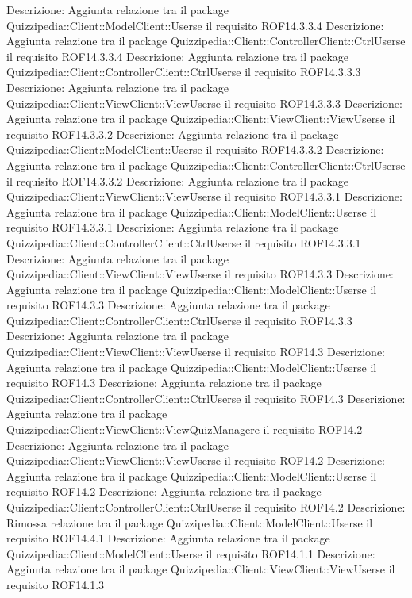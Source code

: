 Descrizione: Aggiunta relazione tra il package Quizzipedia::Client::ModelClient::Userse il requisito ROF14.3.3.4 
Descrizione: Aggiunta relazione tra il package Quizzipedia::Client::ControllerClient::CtrlUserse il requisito ROF14.3.3.4 
Descrizione: Aggiunta relazione tra il package Quizzipedia::Client::ControllerClient::CtrlUserse il requisito ROF14.3.3.3 
Descrizione: Aggiunta relazione tra il package Quizzipedia::Client::ViewClient::ViewUserse il requisito ROF14.3.3.3 
Descrizione: Aggiunta relazione tra il package Quizzipedia::Client::ViewClient::ViewUserse il requisito ROF14.3.3.2 
Descrizione: Aggiunta relazione tra il package Quizzipedia::Client::ModelClient::Userse il requisito ROF14.3.3.2 
Descrizione: Aggiunta relazione tra il package Quizzipedia::Client::ControllerClient::CtrlUserse il requisito ROF14.3.3.2 
Descrizione: Aggiunta relazione tra il package Quizzipedia::Client::ViewClient::ViewUserse il requisito ROF14.3.3.1 
Descrizione: Aggiunta relazione tra il package Quizzipedia::Client::ModelClient::Userse il requisito ROF14.3.3.1 
Descrizione: Aggiunta relazione tra il package Quizzipedia::Client::ControllerClient::CtrlUserse il requisito ROF14.3.3.1 
Descrizione: Aggiunta relazione tra il package Quizzipedia::Client::ViewClient::ViewUserse il requisito ROF14.3.3 
Descrizione: Aggiunta relazione tra il package Quizzipedia::Client::ModelClient::Userse il requisito ROF14.3.3 
Descrizione: Aggiunta relazione tra il package Quizzipedia::Client::ControllerClient::CtrlUserse il requisito ROF14.3.3 
Descrizione: Aggiunta relazione tra il package Quizzipedia::Client::ViewClient::ViewUserse il requisito ROF14.3 
Descrizione: Aggiunta relazione tra il package Quizzipedia::Client::ModelClient::Userse il requisito ROF14.3 
Descrizione: Aggiunta relazione tra il package Quizzipedia::Client::ControllerClient::CtrlUserse il requisito ROF14.3 
Descrizione: Aggiunta relazione tra il package Quizzipedia::Client::ViewClient::ViewQuizManagere il requisito ROF14.2 
Descrizione: Aggiunta relazione tra il package Quizzipedia::Client::ViewClient::ViewUserse il requisito ROF14.2 
Descrizione: Aggiunta relazione tra il package Quizzipedia::Client::ModelClient::Userse il requisito ROF14.2 
Descrizione: Aggiunta relazione tra il package Quizzipedia::Client::ControllerClient::CtrlUserse il requisito ROF14.2 
Descrizione: Rimossa relazione tra il package Quizzipedia::Client::ModelClient::Userse il requisito ROF14.4.1 
Descrizione: Aggiunta relazione tra il package Quizzipedia::Client::ModelClient::Userse il requisito ROF14.1.1 
Descrizione: Aggiunta relazione tra il package Quizzipedia::Client::ViewClient::ViewUserse il requisito ROF14.1.3 
